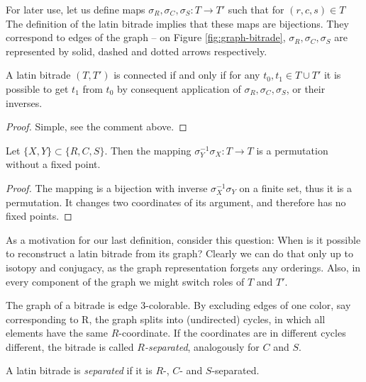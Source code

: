 \noindent
For later use, let us define maps $\sigma_R, \sigma_C, \sigma_S : T \rightarrow T'$ such that for $(r,c,s) \in T$
The definition of the latin bitrade implies that these maps are bijections. They correspond to edges of the graph -- on Figure \ref{fig:graph-bitrade},  $\sigma_R, \sigma_C, \sigma_S$ are represented by solid, dashed and dotted arrows respectively.

\begin{lem}
\label{lem:connected-sigma}
A latin bitrade $(T,T')$ is connected if and only if for any $t_0,t_1 \in T \cup T'$ it is possible to get $t_1$ from $t_0$ by consequent application of $\sigma_R, \sigma_C, \sigma_S$, or their inverses.
\end{lem}
\begin{proof}
Simple, see the comment above.
\end{proof}

\begin{lem}
\label{lem:sigma-cycles}
Let $\{X,Y\} \subset \{R,C,S\}$. Then the mapping $\sigma_Y^{-1}\sigma_X : T \rightarrow T$ is a permutation without a fixed point.
\end{lem}
\begin{proof}
The mapping is a bijection with inverse $\sigma_X^{-1}\sigma_Y$ on a finite set, thus it is a permutation. It changes two coordinates of its argument, and therefore has no fixed points.
\end{proof}

As a motivation for our last definition, consider this question: When is it possible to reconstruct a latin bitrade from its graph? Clearly we can do that only up to isotopy and conjugacy, as the graph representation forgets any orderings. Also, in every component of the graph we might switch roles of $T$ and $T'$.

The graph of a bitrade is edge 3-colorable. By excluding edges of one color, say corresponding to  R, the graph splits into (undirected) cycles, in which all elements have the same $R$-coordinate. If the coordinates are in different cycles different, the bitrade is called \emph{$R$-separated}, analogously for $C$ and $S$.

\begin{defn}
 A latin bitrade is \emph{separated} if it is $R$-, $C$- and $S$-separated.
\end{defn}

